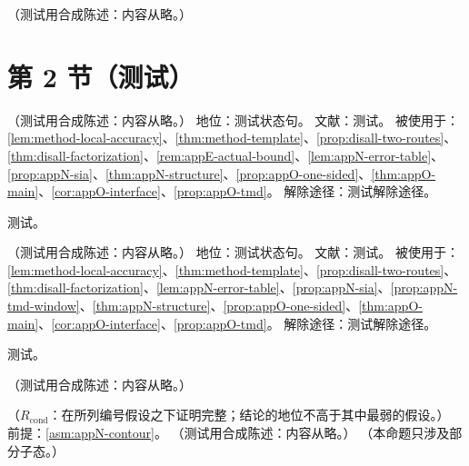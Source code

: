 \begin{definition}[(GA2) 对逐线交封闭的区域集合]\label{def:appN-meet-closed}
（测试用合成陈述：内容从略。）
\end{definition}

\section{第 2 节（测试）}\label{sec:appN-inputs}

\begin{assumption}\label{asm:appN-envelope}
（测试用合成陈述：内容从略。）
地位：测试状态句。
文献：测试。
被使用于：\cref{lem:method-local-accuracy}、\cref{thm:method-template}、\cref{prop:disall-two-routes}、\cref{thm:disall-factorization}、\cref{rem:appE-actual-bound}、\cref{lem:appN-error-table}、\cref{prop:appN-sia}、\cref{thm:appN-structure}、\cref{prop:appO-one-sided}、\cref{thm:appO-main}、\cref{cor:appO-interface}、\cref{prop:appO-tmd}。
解除途径：测试解除途径。
\end{assumption}
\begin{proofsketch}测试。\end{proofsketch}

\begin{assumption}\label{asm:appN-separation}
（测试用合成陈述：内容从略。）
地位：测试状态句。
文献：测试。
被使用于：\cref{lem:method-local-accuracy}、\cref{thm:method-template}、\cref{prop:disall-two-routes}、\cref{thm:disall-factorization}、\cref{lem:appN-error-table}、\cref{prop:appN-sia}、\cref{prop:appN-tmd-window}、\cref{thm:appN-structure}、\cref{prop:appO-one-sided}、\cref{thm:appO-main}、\cref{cor:appO-interface}、\cref{prop:appO-tmd}。
解除途径：测试解除途径。
\end{assumption}
\begin{proofsketch}测试。\end{proofsketch}

\begin{remark}[各输入的地位]\label{rem:appN-inputs-status}
（测试用合成陈述：内容从略。）
\end{remark}

\begin{theorem}\label{thm:appN-subtraction}
（$R_{\mathrm{cond}}$：在所列编号假设之下证明完整；结论的地位不高于其中最弱的假设。）
前提：\cref{asm:appN-contour}。
（测试用合成陈述：内容从略。）
（本命题只涉及部分子态。）
\end{theorem}

